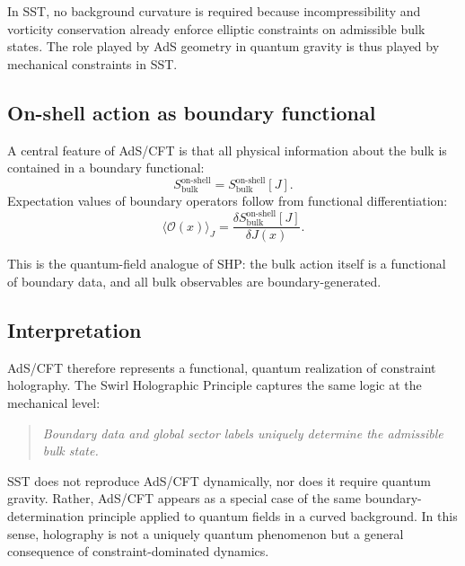 \documentclass[11pt]{article}
\begin{document}
        In SST, no background curvature is required because incompressibility and vorticity
        conservation already enforce elliptic constraints on admissible bulk states. The
        role played by AdS geometry in quantum gravity is thus played by mechanical
        constraints in SST.

    \subsection{On-shell action as boundary functional}

        A central feature of AdS/CFT is that all physical information about the bulk is
        contained in a boundary functional:
        \begin{equation}
            S_{\mathrm{bulk}}^{\mathrm{on\text{-}shell}}
            =
            S_{\mathrm{bulk}}^{\mathrm{on\text{-}shell}}[J].
        \end{equation}
        Expectation values of boundary operators follow from functional differentiation:
        \begin{equation}
            \langle \mathcal{O}(x) \rangle_J
            =
            \frac{\delta S_{\mathrm{bulk}}^{\mathrm{on\text{-}shell}}[J]}{\delta J(x)}.
        \end{equation}

        This is the quantum-field analogue of SHP: the bulk action itself is a functional of
        boundary data, and all bulk observables are boundary-generated.

    \subsection{Interpretation}

        AdS/CFT therefore represents a functional, quantum realization of constraint
        holography. The Swirl Holographic Principle captures the same logic at the
        mechanical level:

        \begin{quote}
            \emph{Boundary data and global sector labels uniquely determine the admissible
            bulk state.}
        \end{quote}

        SST does not reproduce AdS/CFT dynamically, nor does it require quantum gravity.
        Rather, AdS/CFT appears as a special case of the same boundary-determination
        principle applied to quantum fields in a curved background. In this sense,
        holography is not a uniquely quantum phenomenon but a general consequence of
        constraint-dominated dynamics.
\end{document}
